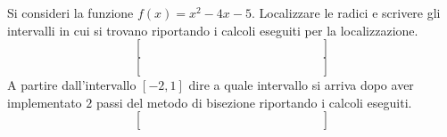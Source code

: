 Si consideri la funzione $f(x)=x^2-4x-5$. Localizzare le radici e 
scrivere gli intervalli in cui si trovano riportando i calcoli 
eseguiti per la localizzazione.
\medskip
\[
\left [
\begin{array}{cccccccccccccc}
\quad &  \quad & \quad &  \quad & \quad & \quad & \quad & \quad  \\
\quad &  \quad & \quad &  \quad & \quad &  \quad & \quad & \quad \\
\quad &  \quad & \quad &  \quad  & \quad  & \quad & \quad & \quad
\end{array}\right]
\]
\medskip
\[
\left [
\begin{array}{cccccccccccccc}
\quad &  \quad & \quad &  \quad & \quad & \quad & \quad & \quad  \\
\quad &  \quad & \quad &  \quad & \quad &  \quad & \quad & \quad \\
\quad &  \quad & \quad &  \quad  & \quad  & \quad & \quad & \quad
\end{array}\right]
\]
\medskip
\noindent A partire dall'intervallo $[-2,1]$ dire a quale 
intervallo si arriva dopo aver implementato $2$ passi del metodo 
di bisezione riportando i calcoli eseguiti.
\medskip
\[
\left[
\begin{array}{cccccccccccccc}
\quad &  \quad & \quad &  \quad & \quad & \quad & \quad & \quad  \\
\quad &  \quad & \quad &  \quad & \quad &  \quad & \quad & \quad \\
\quad &  \quad & \quad &  \quad  & \quad  & \quad & \quad & \quad
\end{array}\right]
\]
